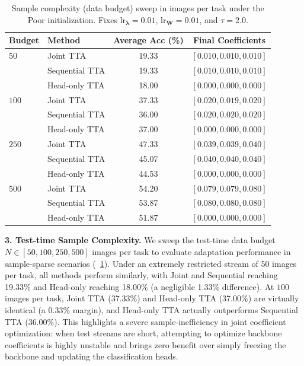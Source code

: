 \documentclass{article}
\theoremstyle{plain}
\theoremstyle{definition}
\theoremstyle{remark}
\begin{document}
\begin{table}[t]
\caption{Sample complexity (data budget) sweep in images per task under the Poor initialization. Fixes $\text{lr}_{\boldsymbol{\lambda}} = 0.01$, $\text{lr}_{\mathbf{W}} = 0.01$, and $\tau = 2.0$.}
\label{tab:budget_sweep}
\vskip 0.08in
\begin{center}
\begin{small}
\begin{sc}
\begin{tabular}{llcc}
\toprule
Budget & Method & Average Acc (\%) & Final Coefficients \\
\midrule
$50$  & Joint TTA      & 19.33 & $[0.010, 0.010, 0.010]$ \\
      & Sequential TTA & 19.33 & $[0.010, 0.010, 0.010]$ \\
      & Head-only TTA  & 18.00 & $[0.000, 0.000, 0.000]$ \\
\midrule
$100$ & Joint TTA      & 37.33 & $[0.020, 0.019, 0.020]$ \\
      & Sequential TTA & 36.00 & $[0.020, 0.020, 0.020]$ \\
      & Head-only TTA  & 37.00 & $[0.000, 0.000, 0.000]$ \\
\midrule
$250$ & Joint TTA      & 47.33 & $[0.039, 0.039, 0.040]$ \\
      & Sequential TTA & 45.07 & $[0.040, 0.040, 0.040]$ \\
      & Head-only TTA  & 44.53 & $[0.000, 0.000, 0.000]$ \\
\midrule
$500$ & Joint TTA      & 54.20 & $[0.079, 0.079, 0.080]$ \\
      & Sequential TTA & 53.87 & $[0.080, 0.080, 0.080]$ \\
      & Head-only TTA  & 51.87 & $[0.000, 0.000, 0.000]$ \\
\bottomrule
\end{tabular}
\end{sc}
\end{small}
\end{center}
\vskip -0.1in
\end{table}

\textbf{3. Test-time Sample Complexity.} We sweep the test-time data budget $N \in [50, 100, 250, 500]$ images per task to evaluate adaptation performance in sample-sparse scenarios (~\cref{tab:budget_sweep}).
Under an extremely restricted stream of 50 images per task, all methods perform similarly, with Joint and Sequential reaching 19.33\% and Head-only reaching 18.00\% (a negligible 1.33\% difference).
At $100$ images per task, Joint TTA (37.33\%) and Head-only TTA (37.00\%) are virtually identical (a 0.33\% margin), and Head-only TTA actually outperforms Sequential TTA (36.00\%).
This highlights a severe sample-inefficiency in joint coefficient optimization: when test streams are short, attempting to optimize backbone coefficients is highly unstable and brings zero benefit over simply freezing the backbone and updating the classification heads.
\end{document}
